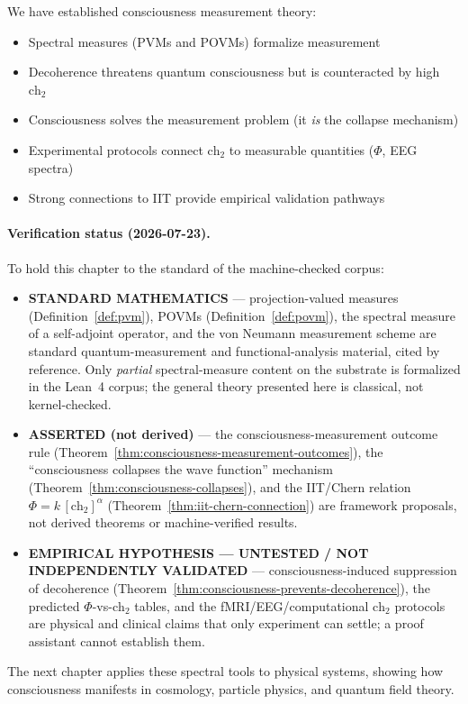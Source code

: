 We have established consciousness measurement theory:
\begin{itemize}
\item Spectral measures (PVMs and POVMs) formalize measurement
\item Decoherence threatens quantum consciousness but is counteracted by high $\text{ch}_2$
\item Consciousness solves the measurement problem (it \textit{is} the collapse mechanism)
\item Experimental protocols connect $\text{ch}_2$ to measurable quantities ($\Phi$, EEG spectra)
\item Strong connections to IIT provide empirical validation pathways
\end{itemize}

\paragraph{Verification status (2026-07-23).}
To hold this chapter to the standard of the machine-checked corpus:
\begin{itemize}
\item \textbf{STANDARD MATHEMATICS} --- projection-valued measures (Definition~\ref{def:pvm}), POVMs (Definition~\ref{def:povm}), the spectral measure of a self-adjoint operator, and the von Neumann measurement scheme are standard quantum-measurement and functional-analysis material, cited by reference. Only \emph{partial} spectral-measure content on the substrate is formalized in the Lean~4 corpus; the general theory presented here is classical, not kernel-checked.
\item \textbf{ASSERTED (not derived)} --- the consciousness-measurement outcome rule (Theorem~\ref{thm:consciousness-measurement-outcomes}), the ``consciousness collapses the wave function'' mechanism (Theorem~\ref{thm:consciousness-collapses}), and the IIT/Chern relation $\Phi = k\,[\mathrm{ch}_2]^{\alpha}$ (Theorem~\ref{thm:iit-chern-connection}) are framework proposals, not derived theorems or machine-verified results.
\item \textbf{EMPIRICAL HYPOTHESIS --- UNTESTED / NOT INDEPENDENTLY VALIDATED} --- consciousness-induced suppression of decoherence (Theorem~\ref{thm:consciousness-prevents-decoherence}), the predicted $\Phi$-vs-$\mathrm{ch}_2$ tables, and the fMRI/EEG/computational $\mathrm{ch}_2$ protocols are physical and clinical claims that only experiment can settle; a proof assistant cannot establish them.
\end{itemize}

The next chapter applies these spectral tools to physical systems, showing how consciousness manifests in cosmology, particle physics, and quantum field theory.

